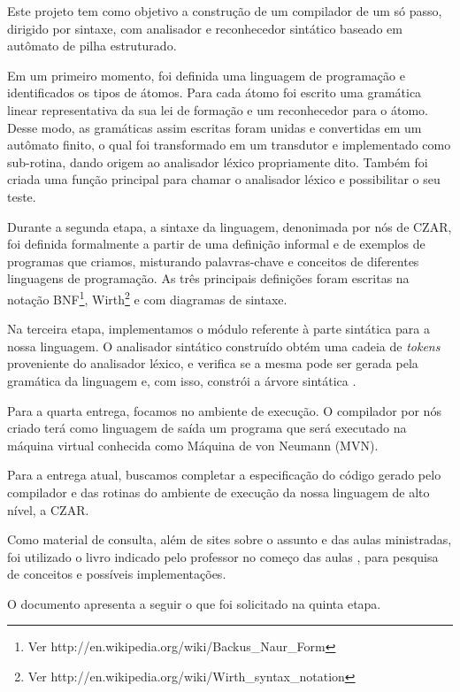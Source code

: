 
Este projeto tem como objetivo a construção de um compilador de um só passo, dirigido por sintaxe, com analisador e reconhecedor sintático baseado em autômato de pilha estruturado.

Em um primeiro momento, foi definida uma linguagem de programação e identificados os tipos de átomos. Para cada átomo foi escrito uma gramática linear representativa da sua lei de formação e um reconhecedor para o átomo. Desse modo, as gramáticas assim escritas foram unidas e convertidas em um autômato finito, o qual foi transformado em um transdutor e implementado como sub-rotina, dando origem ao analisador léxico propriamente dito. Também foi criada uma função principal para chamar o analisador léxico e possibilitar o seu teste.

Durante a segunda etapa, a sintaxe da linguagem, denonimada por nós de CZAR, foi definida formalmente a partir de uma definição informal e de exemplos de programas que criamos, misturando palavras-chave e conceitos de diferentes linguagens de programação. As três principais definições foram escritas na notação BNF\footnote{Ver http://en.wikipedia.org/wiki/Backus\_Naur\_Form}, Wirth\footnote{Ver http://en.wikipedia.org/wiki/Wirth\_syntax\_notation} e com diagramas de sintaxe.

Na terceira etapa, implementamos o módulo referente à parte sintática para a nossa linguagem. O analisador sintático construído obtém uma cadeia de \emph{tokens} proveniente do analisador léxico, e verifica se a mesma pode ser gerada pela gramática da linguagem e, com isso, constrói a árvore sintática \cite{alfred1986compilers}.

Para a quarta entrega, focamos no ambiente de execução. O compilador por nós criado terá como linguagem de saída um programa que será executado na máquina virtual conhecida como Máquina de von Neumann (MVN).

Para a entrega atual, buscamos completar a especificação do código gerado pelo compilador e das rotinas do ambiente de execução da nossa linguagem de alto nível, a CZAR.

Como material de consulta, além de sites sobre o assunto e das aulas ministradas, foi utilizado o livro indicado pelo professor no começo das aulas \cite{intro-compiladores}, para pesquisa de conceitos e possíveis implementações.

O documento apresenta a seguir o que foi solicitado na quinta etapa.
